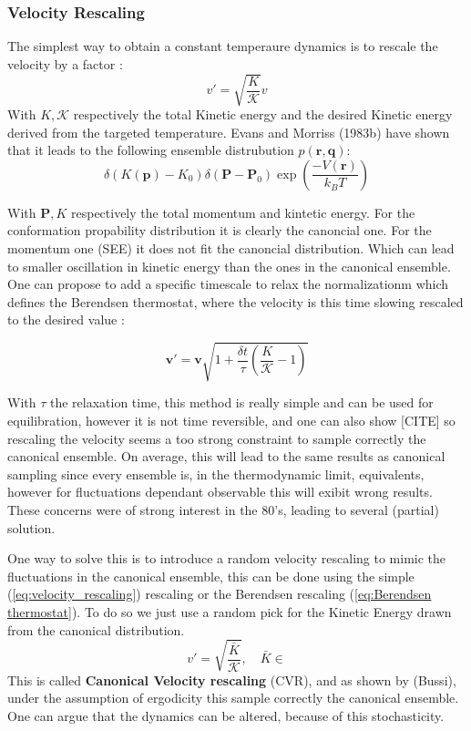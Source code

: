 \documentclass[ansiapaper]{report}
\begin{document}
\begin{multicols}{3}
\subsubsection{Velocity Rescaling}
The simplest way to obtain a constant temperaure dynamics is to rescale the velocity by a factor :
\begin{equation}
    v'=\sqrt{\frac{K}{\mathcal{K}}}v 
    \label{eq:velocity_rescaling}
\end{equation}
With $K, \mathcal{K}$ respectively the total Kinetic energy and the desired Kinetic energy derived from the targeted temperature. 
Evans and Morriss (1983b) have shown that it leads to the following ensemble distrubution  $p \left( \textbf{r}, \textbf{q} \right) $: 
\begin{equation}
    \label{eq:distribution_velocity_rescaling}
     \delta( K( \textbf{p}) - K_0) \delta( \textbf{P} - \textbf{P}_0 ) \exp \left( \frac{-V(\textbf{r})}{k_B T} \right) 
\end{equation}

With $\textbf{P}, K$ respectively the total momentum and kintetic energy. For the conformation propability distribution it is clearly the canoncial one. For the momentum one (SEE) it does not fit the canoncial distribution. Which can lead to smaller oscillation in kinetic energy than the ones in the canonical ensemble. One can propose to add a specific timescale to relax the normalizationm which defines the Berendsen thermostat, where the velocity is this time slowing rescaled to the desired value : 

\begin{equation}
    \textbf{v}' = \textbf{v} \sqrt{1 + \frac{\delta t }{\tau}(\frac{K}{\mathcal{K}} - 1)}
    \label{eq:Berendsen thermostat}
\end{equation}

With $\tau$ the relaxation time, this method is really simple and can be used for equilibration, however it is not time reversible, and one can also show [CITE] so rescaling the velocity seems a too strong constraint to sample correctly the canonical ensemble. On average, this will lead to the same results as canonical sampling since every ensemble is, in the thermodynamic limit, equivalents, however for fluctuations dependant observable this will exibit wrong results.  These concerns were of strong interest in the 80's, leading to several (partial) solution. 

One way to solve this is to introduce a random velocity rescaling to mimic the fluctuations in the canonical ensemble, this can be done using the simple (\ref{eq:velocity_rescaling}) rescaling or the Berendsen rescaling (\ref{eq:Berendsen thermostat}). To do so we just use a random pick for the Kinetic Energy drawn from the canonical distribution. 
$$ v' = \sqrt{\frac{\bar{K}}{\mathcal{K}}}, \quad \bar{K} \in $$
This is called \textbf{Canonical Velocity rescaling} (CVR), and as shown by (Bussi), under the assumption of ergodicity this sample correctly the canonical ensemble. One can argue that the dynamics can be altered, because of this stochasticity. 


\end{multicols}
\end{document}
